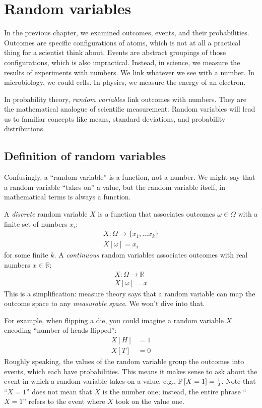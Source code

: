 
\chapter{Random variables}

In the previous chapter, we examined outcomes, events, and their
probabilities. Outcomes are specific configurations of atoms, which is not at
all a practical thing for a scientist think about. Events are abstract
groupings of those configurations, which is also impractical. Instead, in
science, we measure the results of experiments with numbers. We link whatever
we see with a number. In microbiology, we could cells. In physics, we measure
the energy of an electron.

In probability theory, \emph{random variables} link outcomes with numbers.
They are the mathematical analogue of scientific measurement. Random variables
will lead us to familiar concepts like means, standard deviations, and
probability distributions.

\section{Definition of random variables}

Confusingly, a ``random variable'' is a function, not a number. We might say
that a random variable ``takes on'' a value, but the random variable itself,
in mathematical terms is always a function.

A \emph{discrete} random variable $X$ is a function that associates outcomes
$\omega \in \Omega$ with a finite set of numbers $x_i$:
\begin{gather*}
X : \Omega \to \{x_1, \ldots x_k\} \\
X[\omega] = x_i
\end{gather*}
for some finite $k$. A \emph{continuous} random variables associates outcomes with real
numbers $x \in \mathbb{R}$:
\begin{gather*}
X : \Omega \to \mathbb{R} \\
X[\omega] = x
\end{gather*}
This is a simplification: measure theory says that a random variable can map
the outcome space to any \emph{measurable space}. We won't dive into that.

For example, when flipping a die, you could imagine a random variable $X$
encoding ``number of heads flipped'':
\begin{align*}
X[H] &= 1 \\
X[T] &= 0
\end{align*}
Roughly speaking, the values of the random variable group the outcomes into
events, which each have probabilities. This means it makes sense to ask about
the event in which a random variable takes on a value, e.g., $\mathbb{P}\left[{X = 1}\right] = \tfrac{1}{2}$.
Note that ``$X = 1$'' does not mean that $X$ is the number one; instead, the
entire phrase ``$X = 1$'' refers to the event where $X$ took on the value one.

